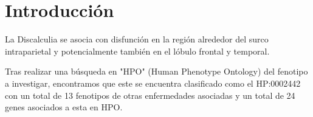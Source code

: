 \section{Introducción}

La Discalculia se asocia con disfunción en la región alrededor del surco intraparietal y potencialmente también en el lóbulo frontal y temporal.

\hfill

Tras realizar una búsqueda en "HPO" (Human Phenotype Ontology) del fenotipo a investigar, encontramos que este se encuentra clasificado como el HP:0002442 con un total de 13 fenotipos de otras enfermedades asociadas y un total de 24 genes asociados a esta en HPO.


